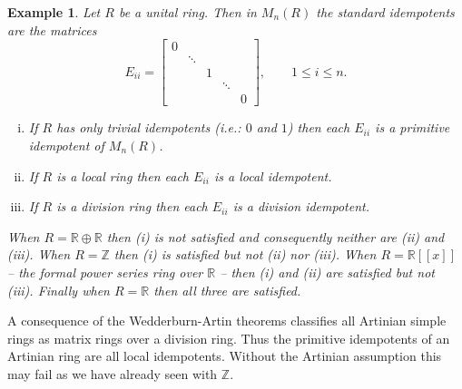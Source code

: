 \documentclass[12pt]{article}
\newtheorem{ex}[thm]{Example}
\begin{document}
\begin{ex}
Let $R$ be a unital ring.  Then in $M_n(R)$ the standard idempotents 
are the matrices
\[E_{ii}=\begin{bmatrix} 
0 & \\
  & \ddots & \\
  &        & 1 \\
  &        &   & \ddots\\
  &        &    &       & 0
\end{bmatrix},\qquad 1\leq i\leq n.\]
\begin{enumerate}[(i)]
\item If $R$ has only trivial idempotents (i.e.: $0$ and $1$) then each
$E_{ii}$ is a primitive idempotent of $M_n(R)$.
\item If $R$ is a local ring then each $E_{ii}$ is a local idempotent.
\item If $R$ is a division ring then each $E_{ii}$ is a division idempotent.
\end{enumerate}
When $R=\mathbb{R}\oplus\mathbb{R}$ then (i) is not satisfied and consequently
neither are (ii) and (iii).  When $R=\mathbb{Z}$ then (i) is satisfied but not
(ii) nor (iii).  When $R=\mathbb{R}[[x]]$ -- the formal power series
ring over $\mathbb{R}$ -- then (i) and (ii) are satisfied but not (iii).
Finally when $R=\mathbb{R}$ then all three are satisfied.
\end{ex}


A consequence of the Wedderburn-Artin theorems classifies all Artinian simple 
rings as matrix rings over a division ring.  Thus the primitive idempotents of an Artinian ring are all local idempotents.  Without the Artinian assumption this may fail as we have already seen with $\mathbb{Z}$.


\end{document}
